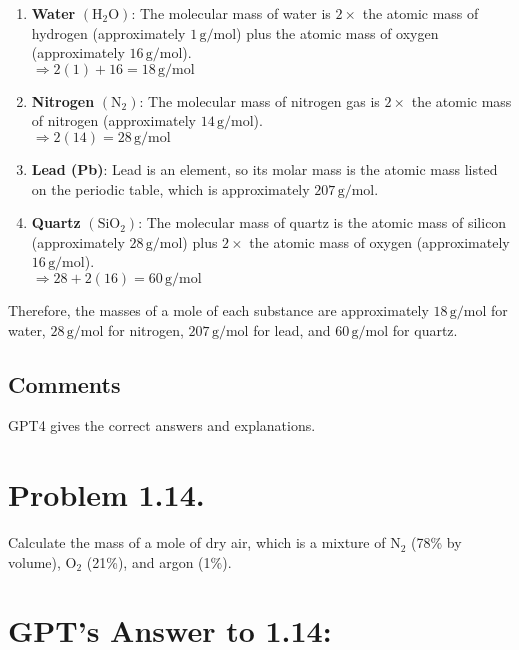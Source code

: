 \documentclass[12pt]{article}
\begin{document}
\begin{enumerate}
    \item \textbf{Water} $\left(\mathrm{H}_2\mathrm{O}\right)$: The molecular mass of water is $2 \times$ the atomic mass of hydrogen (approximately $1 \, \text{g/mol}$) plus the atomic mass of oxygen (approximately $16 \, \text{g/mol}$). \\
    $\Rightarrow 2(1) + 16 = 18 \, \text{g/mol}$
    
    \item \textbf{Nitrogen} $\left(\mathrm{N}_2\right)$: The molecular mass of nitrogen gas is $2 \times$ the atomic mass of nitrogen (approximately $14 \, \text{g/mol}$). \\
    $\Rightarrow 2(14) = 28 \, \text{g/mol}$
    
    \item \textbf{Lead (Pb)}: Lead is an element, so its molar mass is the atomic mass listed on the periodic table, which is approximately $207 \, \text{g/mol}$.
    
    \item \textbf{Quartz} $\left(\mathrm{SiO}_2\right)$: The molecular mass of quartz is the atomic mass of silicon (approximately $28 \, \text{g/mol}$) plus $2 \times$ the atomic mass of oxygen (approximately $16 \, \text{g/mol}$). \\
    $\Rightarrow 28 + 2(16) = 60 \, \text{g/mol}$
\end{enumerate}

Therefore, the masses of a mole of each substance are approximately $18 \, \text{g/mol}$ for water, $28 \, \text{g/mol}$ for nitrogen, $207 \, \text{g/mol}$ for lead, and $60 \, \text{g/mol}$ for quartz.

\subsection*{Comments}

GPT4 gives the correct answers and explanations.

\section*{Problem 1.14.} Calculate the mass of a mole of dry air, which is a mixture of $\mathrm{N}_2$ (78\% by volume), $\mathrm{O}_2$ (21\%), and argon (1\%).

\section*{GPT's Answer to 1.14:}
\end{document}

